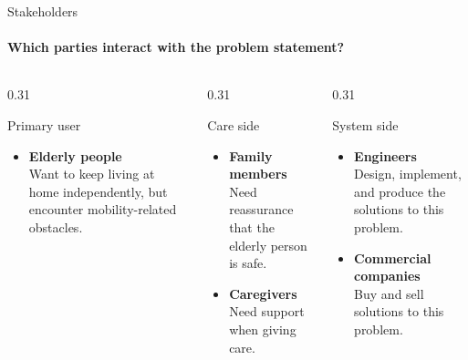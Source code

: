 \begin{frame}{Stakeholders}
\framesubtitle{Which parties interact with the problem statement?}

\begin{columns}[T,onlytextwidth]

\begin{column}{0.31\textwidth}
	\begin{block}{Primary user}
		\begin{itemize}
			\item \textbf{Elderly people} \\
			Want to keep living at home independently, but encounter mobility-related obstacles.
		\end{itemize}
	\end{block}
\end{column}

\begin{column}{0.31\textwidth}
	\begin{block}{Care side}
		\begin{itemize}
			\item \textbf{Family members} \\
			Need reassurance that the elderly person is safe.
			\item \textbf{Caregivers} \\
			Need support when giving care.
		\end{itemize}
	\end{block}
\end{column}

\begin{column}{0.31\textwidth}
	\begin{block}{System side}
		\begin{itemize}
			\item \textbf{Engineers} \\
			Design, implement, and produce the solutions to this problem.
			\item \textbf{Commercial companies} \\
			Buy and sell solutions to this problem.
		\end{itemize}
	\end{block}
\end{column}

\end{columns}

\end{frame}
